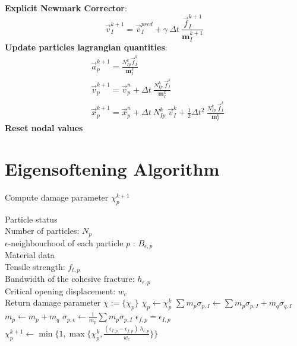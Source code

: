 \message{ !name(2020_EFM_MPM_Eigensoftening.tex)}\documentclass[preprint,12pt,a4paper]{elsarticle}
\newcommand{\tens}[1]{
  \ensuremath{\mathbf{{#1}}}
}
\begin{document}
\begin{algorithm}
\begin{algorithmic}[1]
    \STATE \textbf{Explicit Newmark Corrector}:\\
    \begin{equation*}
      \vec{v}_{I}^{k+1} = \vec{v}_{I}^{pred} + \gamma\ \Delta t\ \frac{\vec{f}_{I}^{k+1}}{\tens{m}_I^{k+1}}  
    \end{equation*}
    \STATE \textbf{Update particles lagrangian quantities}:
    \begin{align*}
      &\vec{a}_p^{k+1} = \frac{N_{Ip}^k\vec{f}_{I}^{k}}{\tens{m}_I^k}\\
      &\vec{v}_p^{k+1} = \vec{v}_p^n + \Delta t\
        \frac{N_{Ip}^k\
        \vec{f}_{I}^{k}}{\tens{m}_I^k}\\
      &\vec{x}_p^{k+1} = \vec{x}_p^n + \Delta t\
         N_{Ip}^k\ \vec{v}_{I}^{k} +
        \frac{1}{2}\Delta t^2\ \frac{N_{Ip}^k\
        \vec{f}_{I}^{k}}{\tens{m}_I^k}
    \end{align*}
    \STATE \textbf{Reset nodal values}
  \end{algorithmic}
\end{algorithm} 


\section{Eigensoftening Algorithm}
\label{sec:eigens-algor-1}

\begin{algorithm}
  \caption{Compute damage parameter $\chi_p^{k+1}$}
  \label{alg-eigens}
  \begin{algorithmic}
    \Require Particle status\\
    Number of particles: $N_p$\\
    $\epsilon$-neighbourhood of each particle $p$ : $B_{\epsilon,p}$\\
    \Require Material data\\
    Tensile strength: $f_{t,p}$\\
    Bandwidth of the cohesive fracture: $h_{\epsilon,p}$ \\
    Critical opening displacement: $w_c$\\ 
    \Ensure Return damage parameter $\chi := \{\chi_p\}$
    \State $\chi_p \leftarrow \chi_p^{k}$
    \For{$p$ to $N_p$}
    \For{$q \in B_{\epsilon,p}$}
    \If{$\chi_q < 1$}    
    \State $\sum m_p\sigma_{p,I} \leftarrow \sum m_p\sigma_{p,I} + m_q\sigma_{q,I}$
    \EndIf    
    \State $m_p \leftarrow m_p + m_q$
    \EndFor
    \State $\sigma_{p,\epsilon} \leftarrow \frac{1}{m_p} \sum m_p\sigma_{p,I}$
    \State $\epsilon_{f,p} = \epsilon_{I,p}$   
    \EndIf        
    \Else[$\chi_p \neq 1$ \AND $\epsilon_{f,p} > 0$]
    \State $\chi_p^{k+1} \leftarrow \min\Big \{1 , \max \{\chi_p^{k},
    \frac{(\epsilon_{I,p}- \epsilon_{f,p})\ h_{\epsilon,p}}{w_c} \} \Big \}$    
    \EndIf    
    \EndFor
  \end{algorithmic}
\end{algorithm}

 
\end{document}
